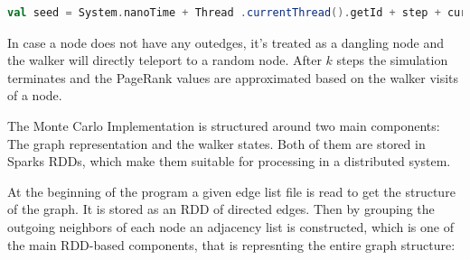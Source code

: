 \vspace{0.5em}
\begin{lstlisting}[language=Scala, caption={Random Seed}, label={lst:randseed}]
val seed = System.nanoTime + Thread .currentThread().getId + step + currentNode.toInt
\end{lstlisting}
\vspace{0.5em}

In case a node does not have any outedges, it's treated as a dangling node and the walker will directly teleport to a random node.
After $k$ steps the simulation terminates and the PageRank values are approximated based on the walker visits of a node.


The Monte Carlo Implementation is structured around two main components: The graph representation and the walker states. Both of them are stored in Sparks RDDs, which make them suitable for processing in a distributed system.

At the beginning of the program a given edge list file is read to get the structure of the graph. It is stored as an RDD of directed edges. Then by grouping the outgoing neighbors of each node an adjacency list is constructed, which is one of the main RDD-based components, that is represnting the entire graph structure:

